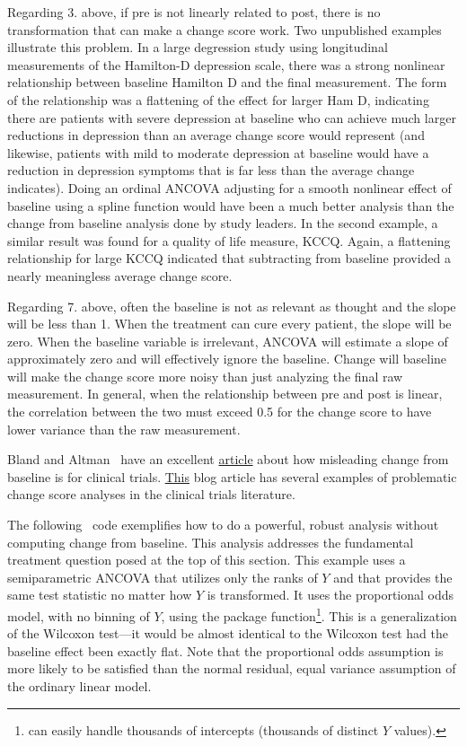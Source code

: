 Regarding 3. above, if pre is not linearly related to post, there is no transformation that can make a change score work.  Two unpublished examples illustrate this problem.  In a large degression study using longitudinal measurements of the Hamilton-D depression scale, there was a strong nonlinear relationship between baseline Hamilton D and the final measurement.  The form of the relationship was a flattening of the effect for larger Ham D, indicating there are patients with severe depression at baseline who can achieve much larger reductions in depression than an average change score would represent (and likewise, patients with mild to moderate depression at baseline would have a reduction in depression symptoms that is far less than the average change indicates).  Doing an ordinal ANCOVA adjusting for a smooth nonlinear effect of baseline using a spline function would have been a much better analysis than the change from baseline analysis done by study leaders.  In the second example, a similar result was found for a quality of life measure, KCCQ.  Again, a flattening relationship for large KCCQ indicated that subtracting from baseline provided a nearly meaningless average change score.

Regarding 7. above, often the baseline is not as relevant as thought and the slope will be less than 1.  When the treatment can cure every patient, the slope will be zero.  When the baseline variable is irrelevant, ANCOVA will estimate a slope of approximately zero and will effectively ignore the baseline.  Change will baseline will make the change score more noisy than just analyzing the final raw measurement.  In general, when the relationship between pre and post is linear, the correlation between the two must exceed 0.5 for the change score to have lower variance than the raw measurement.

Bland and Altman~\cite{bla11com} have an excellent \href{https://www.ncbi.nlm.nih.gov/pmc/articles/PMC3286439}{article} about how misleading change from baseline is for clinical trials.  \href{http://www.fharrell.com/post/errmed#change}{This} blog article has several examples of problematic change score analyses in the clinical trials literature.

The following \R\ code exemplifies how to do a powerful, robust analysis without computing change from baseline.  This analysis addresses the fundamental treatment question posed at the top of this section.  This example uses a semiparametric ANCOVA that utilizes only the ranks of $Y$ and that provides the same test statistic no matter how $Y$ is transformed.  It uses the proportional odds model, with no binning of $Y$, using the  package  function\footnote{ can easily handle thousands of intercepts (thousands of distinct $Y$ values).}.  This is a generalization of the Wilcoxon test---it would be almost identical to the Wilcoxon test had the baseline effect been exactly flat.  Note that the proportional odds assumption is more likely to be satisfied than the normal residual, equal variance assumption of the ordinary linear model.

